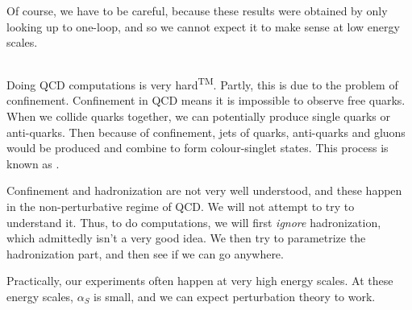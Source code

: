 \documentclass[a4paper]{article}
\begin{document}
Of course, we have to be careful, because these results were obtained by only looking up to one-loop, and so we cannot expect it to make sense at low energy scales.

\subsection{}
Doing QCD computations is very hard\textsuperscript{TM}. Partly, this is due to the problem of confinement. Confinement in QCD means it is impossible to observe free quarks. When we collide quarks together, we can potentially produce single quarks or anti-quarks. Then because of confinement, jets of quarks, anti-quarks and gluons would be produced and combine to form colour-singlet states. This process is known as .

Confinement and hadronization are not very well understood, and these happen in the non-perturbative regime of QCD. We will not attempt to try to understand it. Thus, to do computations, we will first \emph{ignore} hadronization, which admittedly isn't a very good idea. We then try to parametrize the hadronization part, and then see if we can go anywhere.

Practically, our experiments often happen at very high energy scales. At these energy scales, $\alpha_S$ is small, and we can expect perturbation theory to work.
\end{document}
